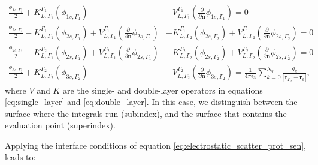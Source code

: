 \begin{align} \label{eq:integral_eq_lspr_nobc_system}
\frac{\phi_{1s,\Gamma_1}}{2}+ K_{L,\Gamma_1}^{\Gamma_1}(\phi_{1s,\Gamma_1}) &- V_{L,\Gamma_1}^{\Gamma_1} \left(\frac{\partial}{\partial \mathbf{n}}\phi_{1s,\Gamma_1} \right) = 0  \nonumber \\
\frac{\phi_{2s,\Gamma_1}}{2} - K_{L,\Gamma_1}^{\Gamma_1}(\phi_{2s,\Gamma_1}) + V_{L,\Gamma_1}^{\Gamma_1} \left(\frac{\partial}{\partial \mathbf{n}}\phi_{2s,\Gamma_1} \right) 
& - K_{L,\Gamma_2}^{\Gamma_1}(\phi_{2s,\Gamma_2}) + V_{L,\Gamma_2}^{\Gamma_1} \left(\frac{\partial}{\partial \mathbf{n}}\phi_{2s,\Gamma_2} \right) = 0  \nonumber \\
\frac{\phi_{2s,\Gamma_2}}{2} - K_{L,\Gamma_1}^{\Gamma_2}(\phi_{2s,\Gamma_1}) + V_{L,\Gamma_1}^{\Gamma_2} \left(\frac{\partial}{\partial \mathbf{n}}\phi_{2s,\Gamma_1} \right)  
&- K_{L,\Gamma_2}^{\Gamma_2}(\phi_{2s,\Gamma_2}) + V_{L,\Gamma_2}^{\Gamma_2} \left(\frac{\partial}{\partial \mathbf{n}}\phi_{2s,\Gamma_2} \right) = 0  \nonumber \\
\frac{\phi_{3s,\Gamma_2}}{2} + K_{L,\Gamma_2}^{\Gamma_2}(\phi_{3s,\Gamma_2}) &- V_{L,\Gamma_2}^{\Gamma_2} \left( \frac{\partial}{\partial \mathbf{n}} \phi_{3s,\Gamma_2} \right) = \frac{1}{4\pi\epsilon_3} \sum_{k=0}^{N_q} \frac{q_k}{|\mathbf{r}_{\Gamma_2} - \mathbf{r}_k|} ,
\end{align}
%
where $V$ and $K$ are the single- and double-layer operators in equations 
\eqref{eq:single_layer} and \eqref{eq:double_layer}. In this case, we distinguish between the
surface where the integrals run (subindex), and the surface that contains the evaluation point (superindex).

Applying the interface conditions of equation \eqref{eq:electrostatic_scatter_prot_sen},
leads to: 

